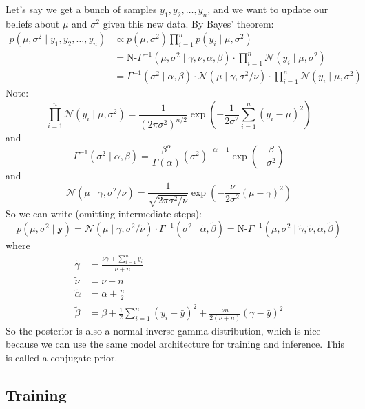 \documentclass{article}
\renewcommand{\b}{\mathbf}
\newcommand{\f}{\frac}
\newcommand{\0}{\varnothing}
\theoremstyle{definition}
\begin{document}
Let's say we get a bunch of samples $y_1, y_2, \ldots, y_n$, and we want to update our beliefs about $\mu$ and $\sigma^2$ given this new data. By Bayes' theorem:
\begin{align*}
    p(\mu, \sigma^2 \mid y_1, y_2, \ldots, y_n) &\propto p(\mu, \sigma^2) \prod_{i=1}^n p(y_i \mid \mu, \sigma^2) \\
    &=\text{N-}\Gamma^{-1}(\mu, \sigma^2 \mid \gamma, \nu, \alpha, \beta) \cdot \prod_{i=1}^n \mathcal{N}(y_i \mid \mu, \sigma^2) \\
    &=\Gamma^{-1}(\sigma^2 \mid \alpha, \beta) \cdot \mathcal{N}(\mu \mid \gamma, \sigma^2/\nu) \cdot \prod_{i=1}^n \mathcal{N}(y_i \mid \mu, \sigma^2)
\end{align*}
Note:
$$\prod_{i=1}^n \mathcal{N}(y_i \mid \mu, \sigma^2) = \f{1}{(2\pi\sigma^2)^{n/2}} \exp\left(-\f{1}{2\sigma^2}\sum_{i=1}^n (y_i - \mu)^2\right)$$
and
$$\Gamma^{-1}(\sigma^2 \mid \alpha, \beta) = \f{\beta^\alpha}{\Gamma(\alpha)} (\sigma^2)^{-\alpha - 1} \exp\left(-\f{\beta}{\sigma^2}\right)$$
and
$$\mathcal{N}(\mu \mid \gamma, \sigma^2/\nu) = \f{1}{\sqrt{2\pi\sigma^2/\nu}} \exp\left(-\f{\nu}{2\sigma^2}(\mu - \gamma)^2\right)$$
So we can write (omitting intermediate steps):
$$p(\mu, \sigma^2 \mid \b{y}) = \mathcal{N}(\mu \mid \tilde{\gamma}, \sigma^2 / \tilde{\nu}) \cdot \Gamma^{-1}(\sigma^2 \mid \tilde{\alpha}, \tilde{\beta}) = \text{N-}\Gamma^{-1}(\mu, \sigma^2 \mid \tilde{\gamma}, \tilde{\nu}, \tilde{\alpha}, \tilde{\beta})$$
where
\begin{align*}
    \tilde{\gamma} &= \f{\nu\gamma + \sum_{i=1}^n y_i}{\nu + n} \\
    \tilde{\nu} &= \nu + n \\
    \tilde{\alpha} &= \alpha + \f{n}{2} \\
    \tilde{\beta} &= \beta + \f{1}{2}\sum_{i=1}^n (y_i - \bar{y})^2 + \f{\nu n}{2(\nu + n)}\left(\gamma - \bar{y}\right)^2
\end{align*}
So the posterior is also a normal-inverse-gamma distribution, which is nice because we can use the same model architecture for training and inference. This is called a conjugate prior.

\subsection{Training}
\end{document}
